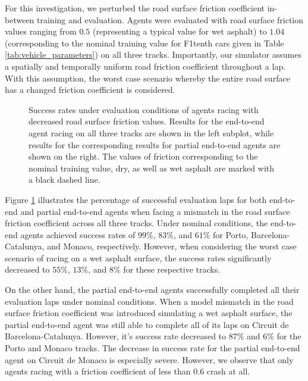 For this investigation, we perturbed the road surface friction coefficient in-between training and evaluation.
Agents were evaluated with road surface friction values ranging from $0.5$ (representing a typical value for wet asphalt) to $1.04$ (corresponding to the nominal training value for F1tenth cars given in Table \ref{tab:vehicle_parameters}) on all three tracks. 
Importantly, our simulator assumes a spatially and temporally uniform road friction coefficient throughout a lap.
With this assumption, the worst case scenario whereby the entire road surface has a changed friction coefficient is considered.

\begin{figure}[b]
    \centering
    
    \caption[Success rate of agents under evaluation conditions with mismatched road surface friction coefficient]{Success rates under evaluation conditions of agents racing with decreased road surface friction values. Results for the end-to-end agent racing on all three tracks are shown in the left subplot, while results for the corresponding results for partial end-to-end agents are shown on the right. The values of friction corresponding to the nominal training value, dry, as well as wet asphalt are marked with a black dashed line.}
    \label{fig:mu}
\end{figure}


Figure \ref{fig:mu} illustrates the percentage of successful evaluation laps for both end-to-end and partial end-to-end agents when facing a mismatch in the road surface friction coefficient across all three tracks. 
Under nominal conditions, the end-to-end agents achieved success rates of $99\%$, $83\%$, and $61\%$ for Porto, Barcelona-Catalunya, and Monaco, respectively. However, when considering the worst case scenario of racing on a wet asphalt surface, the success rates significantly decreased to $55\%$, $13\%$, and $8\%$ for these respective tracks.

On the other hand, the partial end-to-end agents successfully completed all their evaluation laps under nominal conditions. 
When a model mismatch in the road surface friction coefficient was introduced simulating a wet asphalt surface, the partial end-to-end agent was still able to complete all of its laps on Circuit de Barcelona-Catalunya.
However, it's success rate decreased to  $87\%$ and $6\%$ for the Porto and Monaco tracks.
The decrease in success rate for the partial end-to-end agent on Circuit de Monaco is especially severe.
However, we observe that only agents racing with a friction coefficient of less than $0.6$ crash at all. 

